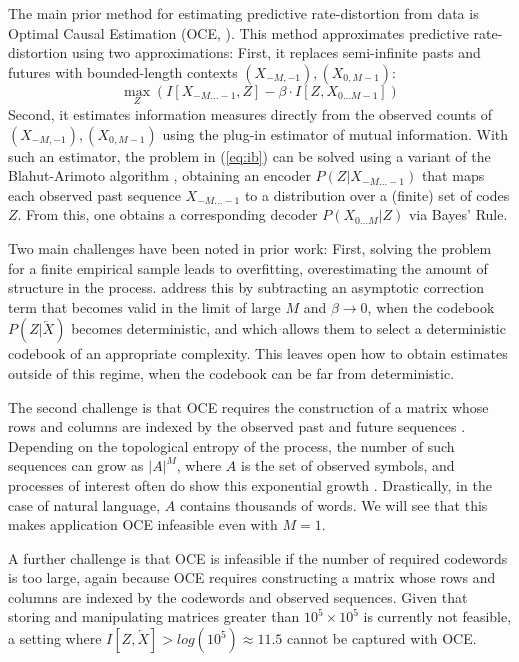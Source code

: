 \documentclass[11pt,letterpaper]{article}
\begin{document}
The main prior method for estimating predictive rate-distortion from data is Optimal Causal Estimation (OCE, \citet{still-optimal-2010}).
This method approximates predictive rate-distortion using two approximations:
First, it replaces semi-infinite pasts and futures with bounded-length contexts $(X_{-M, -1}), (X_{0, M-1})$:
\begin{equation}\label{eq:ib-oce}
	\max_{Z} \left( I[X_{-M\dots -1}, Z] - \beta \cdot I[Z, X_{0\dots M-1}] \right)
\end{equation}
Second, it estimates information measures directly from the observed counts of $(X_{-M, -1}), (X_{0, M-1})$ using the plug-in estimator of mutual information.
With such an estimator, the problem in (\ref{eq:ib}) can be solved using a variant of the Blahut-Arimoto algorithm \citep{tishby-information-1999}, obtaining an encoder $P(Z|X_{-M...-1})$ that maps each observed past sequence $X_{-M...-1}$ to a distribution over a (finite) set of codes $Z$. From this, one obtains a corresponding decoder $P(X_{0...M}|Z)$ via Bayes' Rule.

Two main challenges have been noted in prior work:
First, solving the problem for a finite empirical sample leads to overfitting, overestimating the amount of structure in the process.
\citet{still-optimal-2010} address this by subtracting an asymptotic correction term that becomes valid in the limit of large $M$ and $\beta \rightarrow 0$, when the codebook $P(Z|\overleftarrow{X})$ becomes deterministic, and which allows them to select a deterministic codebook of an appropriate complexity.
This leaves open how to obtain estimates outside of this regime, when the codebook can be far from deterministic.

The second challenge is that OCE requires the construction of a matrix whose rows and columns are indexed by the observed past and future sequences \citep{marzen-predictive-2016}.
Depending on the topological entropy of the process, the number of such sequences can grow as $|A|^M$, where $A$ is the set of observed symbols, and processes of interest often do show this exponential growth \citep{marzen-predictive-2016}.
Drastically, in the case of natural language, $A$ contains thousands of words.
We will see that this makes application OCE infeasible even with $M=1$.

A further challenge is that OCE is infeasible if the number of required codewords is too large, again because OCE requires constructing a matrix whose rows and columns are indexed by the codewords and observed sequences.
Given that storing and manipulating matrices greater than $10^5 \times 10^5$ is currently not feasible, a setting where $I[Z, \overleftarrow{X}] > log(10^5) \approx 11.5$ cannot be captured with OCE.
\end{document}
